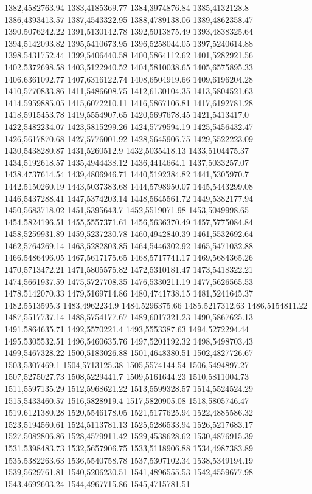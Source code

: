 1382,4582763.94
1383,4185369.77
1384,3974876.84
1385,4132128.8
1386,4393413.57
1387,4543322.95
1388,4789138.06
1389,4862358.47
1390,5076242.22
1391,5130142.78
1392,5013875.49
1393,4838325.64
1394,5142093.82
1395,5410673.95
1396,5258044.05
1397,5240614.88
1398,5431752.44
1399,5406440.58
1400,5864112.62
1401,5282921.56
1402,5372698.58
1403,5122940.52
1404,5810038.65
1405,6575895.33
1406,6361092.77
1407,6316122.74
1408,6504919.66
1409,6196204.28
1410,5770833.86
1411,5486608.75
1412,6130104.35
1413,5804521.63
1414,5959885.05
1415,6072210.11
1416,5867106.81
1417,6192781.28
1418,5915453.78
1419,5554907.65
1420,5697678.45
1421,5413417.0
1422,5482234.07
1423,5815299.26
1424,5779594.19
1425,5456432.47
1426,5617870.68
1427,5776001.92
1428,5645906.75
1429,5522223.09
1430,5438280.87
1431,5260512.9
1432,5035418.13
1433,5104475.37
1434,5192618.57
1435,4944438.12
1436,4414664.1
1437,5033257.07
1438,4737614.54
1439,4806946.71
1440,5192384.82
1441,5305970.7
1442,5150260.19
1443,5037383.68
1444,5798950.07
1445,5443299.08
1446,5437288.41
1447,5374203.14
1448,5645561.72
1449,5382177.94
1450,5683718.02
1451,5395643.7
1452,5519071.98
1453,5049998.65
1454,5824196.51
1455,5557371.61
1456,5636370.49
1457,5775084.84
1458,5259931.89
1459,5237230.78
1460,4942840.39
1461,5532692.64
1462,5764269.14
1463,5282803.85
1464,5446302.92
1465,5471032.88
1466,5486496.05
1467,5617175.65
1468,5717741.17
1469,5684365.26
1470,5713472.21
1471,5805575.82
1472,5310181.47
1473,5418322.21
1474,5661937.59
1475,5727708.35
1476,5330211.19
1477,5626565.53
1478,5142070.33
1479,5169714.86
1480,4741738.15
1481,5241645.37
1482,5513595.3
1483,4962234.9
1484,5296375.66
1485,5217312.63
1486,5154811.22
1487,5517737.14
1488,5754177.67
1489,6017321.23
1490,5867625.13
1491,5864635.71
1492,5570221.4
1493,5553387.63
1494,5272294.44
1495,5305532.51
1496,5460635.76
1497,5201192.32
1498,5498703.43
1499,5467328.22
1500,5183026.88
1501,4648380.51
1502,4827726.67
1503,5307469.1
1504,5713125.38
1505,5574144.54
1506,5494897.27
1507,5275027.73
1508,5229441.7
1509,5161644.23
1510,5811004.73
1511,5597135.29
1512,5968621.22
1513,5599328.57
1514,5524524.29
1515,5433460.57
1516,5828919.4
1517,5820905.08
1518,5805746.47
1519,6121380.28
1520,5546178.05
1521,5177625.94
1522,4885586.32
1523,5194560.61
1524,5113781.13
1525,5286533.94
1526,5217683.17
1527,5082806.86
1528,4579911.42
1529,4538628.62
1530,4876915.39
1531,5398483.73
1532,5657906.75
1533,5118906.88
1534,4987383.89
1535,5382263.63
1536,5540758.78
1537,5307102.34
1538,5349194.19
1539,5629761.81
1540,5206230.51
1541,4896555.53
1542,4559677.98
1543,4692603.24
1544,4967715.86
1545,4715781.51
